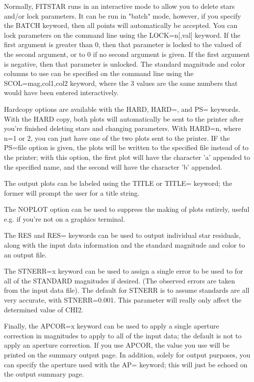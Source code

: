 Normally, FITSTAR runs in an interactive mode to allow you to delete stars
and/or lock parameters. It can be run in "batch" mode, however, if you
specify the BATCH keyword, then all points will automatically be
accepted. You can lock parameters on the command line using the
LOCK=n{[,val]} keyword. If the first argument is greater than 0, then that
parameter is locked to the valued of the second argument, or to 0 if no
second argument is given.  If the first argument is negative, then that
parameter is unlocked.  The standard magnitude and color columns to use can
be specified on the command line using the SCOL=mag,col1,col2 keyword,
where the 3 values are the same numbers that would have been entered
interactively.

Hardcopy options are available with the HARD, HARD=, and PS= keywords. With
the HARD copy, both plots will automatically be sent to the printer after
you're finished deleting stars and changing parameters. With HARD=n, where
n=1 or 2, you can just have one of the two plots sent to the printer. IF
the PS=file option is given, the plots will be written to the specified
file instead of to the printer; with this option, the first plot will have
the character 'a' appended to the specified name, and the second will have
the character 'b' appended.

The output plots can be labeled using the TITLE or TITLE= keyword; the
former will prompt the user for a title string.
  
The NOPLOT option can be used to suppress the making of plots entirely,
useful e.g. if you're not on a graphics terminal.

The RES and RES= keywords can be used to output individual star residuals,
along with the input data information and the standard magnitude and color
to an output file.

The STNERR=x keyword can be used to assign a single error to be used to for
all of the STANDARD magnitudes if desired. (The observed errors are taken
from the input data file). The default for STNERR is to assume standards
are all very accurate, with STNERR=0.001. This parameter will really only
affect the determined value of CHI2.
 
Finally, the APCOR=x keyword can be used to apply a single aperture
correction in magnitudes to apply to all of the input data; the default is
not to apply an aperture correction. If you use APCOR, the value you use
will be printed on the summary output page. In addition, solely for output
purposes, you can specify the aperture used with the AP= keyword; this will
just be echoed on the output summary page.

